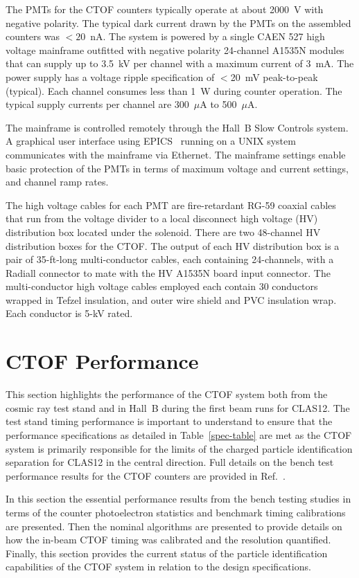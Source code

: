 \documentclass{elsart}
\begin{document}
The PMTs for the CTOF counters typically operate at about 2000~V with negative polarity. The typical
dark current drawn by the PMTs on the assembled counters was $<20$~nA. The system is powered by a
single CAEN 527 high voltage mainframe outfitted with negative polarity 24-channel A1535N modules that
can supply up to 3.5~kV per channel with a maximum current of 3~mA. The power supply has a voltage ripple
specification of $<$20~mV peak-to-peak (typical). Each channel consumes less than 1~W during counter
operation. The typical supply currents per channel are 300~$\mu$A to 500~$\mu$A.

The mainframe is controlled remotely through the Hall~B Slow Controls system. A graphical user interface
using EPICS~\cite{epics} running on a UNIX system communicates with the mainframe via Ethernet. The
mainframe settings enable basic protection of the PMTs in terms of maximum voltage and current settings,
and channel ramp rates.

The high voltage cables for each PMT are fire-retardant RG-59 coaxial cables that run from the voltage
divider to a local disconnect high voltage (HV) distribution box located under the solenoid. There are two
48-channel HV distribution boxes for the CTOF. The output of each HV distribution box is a pair of 
35-ft-long multi-conductor cables, each containing 24-channels, with a Radiall connector to mate with the
HV A1535N board input connector. The multi-conductor high voltage cables employed each contain 30
conductors wrapped in Tefzel insulation, and outer wire shield and PVC insulation wrap. Each conductor
is 5-kV rated.

\section{CTOF Performance}
\label{sec:performance}

This section highlights the performance of the CTOF system both from the cosmic ray test stand
and in Hall~B during the first beam runs for CLAS12. The test stand timing performance is important
to understand to ensure that the performance specifications as detailed in Table~\ref{spec-table} are
met as the CTOF system is primarily responsible for the limits of the charged particle identification
separation for CLAS12 in the central direction. Full details on the bench test performance results for
the CTOF counters are provided in Ref.~\cite{dsc-cn2016-009}.

In this section the essential performance results from the bench testing studies in terms of the counter
photoelectron statistics and benchmark timing calibrations are presented. Then the nominal algorithms
are presented to provide details on how the in-beam CTOF timing was calibrated and the resolution
quantified. Finally, this section provides the current status of the particle identification capabilities
of the CTOF system in relation to the design specifications.
\end{document}
